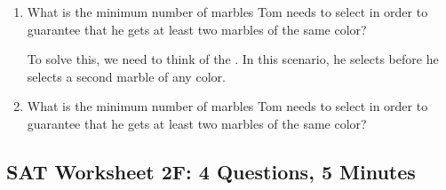 \begin{enumerate}[label=\alph*)]
\item What is the minimum number of marbles Tom needs to select in order to guarantee that he gets at least two marbles of the same color? 

\bigskip
To solve this, we need to think of the \longline. In this scenario, he selects \longline before he selects a second marble of any color. 


\vfill
\item What is the minimum number of marbles Tom needs to select in order to guarantee that he gets at least two marbles of the same color?
\end{enumerate}

\vfill
\newpage
\subsection{SAT Worksheet 2F: 4 Questions, 5 Minutes}

